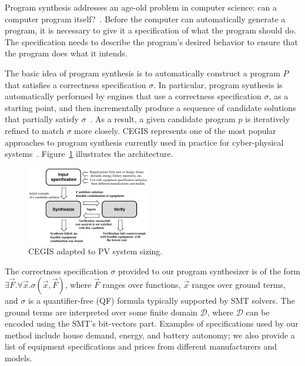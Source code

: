 \documentclass[journal]{IEEEtran}
\begin{document}
Program synthesis addresses an age-old problem in computer science: can a computer program itself?~\cite{Bornholt2019}. Before the computer can automatically generate a program, it is necessary to give it a specification of what the program should do. The specification needs to describe the program's desired behavior to ensure that the program does what it intends.

The basic idea of program synthesis is to automatically construct a program $P$ that satisfies a correctness specification $\sigma$. In particular, program synthesis is automatically performed by engines that use a correctness specification $\sigma$, as a starting point, and then incrementally produce a sequence of candidate solutions that partially satisfy $\sigma$~\cite{Abateetal2017}. As a result, a given candidate program $p$ is iteratively refined to match $\sigma$ more closely. CEGIS represents one of the most popular approaches to program synthesis currently used in practice for cyber-physical systems~\cite{Abateetal2017}. %
Figure~\ref{Counter-Example-Guided-Inductive-Synthesis} illustrates the architecture. 
%
\begin{figure}[h]
	\centering
	\includegraphics[width=0.48\textwidth]{fig2_rev2.jpg}
	\caption{CEGIS adapted to PV system sizing.}
	\label{Counter-Example-Guided-Inductive-Synthesis}
\end{figure}

The correctness specification $\sigma$ provided to our program synthesizer is of the form $\exists \vec{F} . \forall \vec{x}. \sigma(\vec{x}, \vec{F})$, where $\vec{F}$ ranges over functions, $\vec{x}$ ranges over ground terms, and $\sigma$ is a quantifier-free (QF) formula typically supported by SMT solvers. The ground terms are interpreted over some finite domain $\mathcal{D}$, where $\mathcal{D}$ can be encoded using the SMT's bit-vectors part. Examples of specifications used by our method include house demand, energy, and battery autonomy; we also provide a list of equipment specifications and prices from different manufacturers and models.
\end{document}
